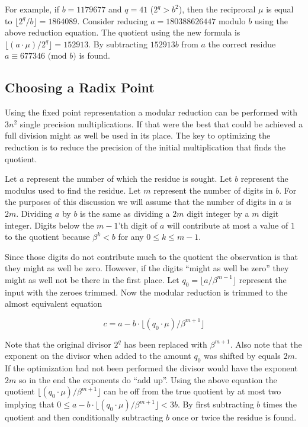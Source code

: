 \documentclass[b5paper]{book}
\begin{document}
For example, if $b = 1179677$ and $q = 41$ ($2^q > b^2$), then the reciprocal $\mu$ is equal to $\lfloor 2^q / b \rfloor = 1864089$.  Consider reducing
$a = 180388626447$ modulo $b$ using the above reduction equation.  The quotient using the new formula is $\lfloor (a \cdot \mu) / 2^q \rfloor = 152913$.
By subtracting $152913b$ from $a$ the correct residue $a \equiv 677346 \mbox{ (mod }b\mbox{)}$ is found.

\subsection{Choosing a Radix Point}
Using the fixed point representation a modular reduction can be performed with $3n^2$ single precision multiplications.  If that were the best
that could be achieved a full division might as well be used in its place.  The key to optimizing the reduction is to reduce the precision of
the initial multiplication that finds the quotient.  

Let $a$ represent the number of which the residue is sought.  Let $b$ represent the modulus used to find the residue.  Let $m$ represent
the number of digits in $b$.  For the purposes of this discussion we will assume that the number of digits in $a$ is $2m$.  Dividing $a$ by 
$b$ is the same as dividing a $2m$ digit integer by a $m$ digit integer.  Digits below the $m - 1$'th digit of $a$ will contribute at most a value
of $1$ to the quotient because $\beta^k < b$ for any $0 \le k \le m - 1$.  

Since those digits do not contribute much to the quotient the observation is that they might as well be zero.  However, if the digits 
``might as well be zero'' they might as well not be there in the first place.  Let $q_0 = \lfloor a/\beta^{m-1} \rfloor$ represent the input
with the zeroes trimmed.  Now the modular reduction is trimmed to the almost equivalent equation

\begin{equation}
c = a - b \cdot \lfloor (q_0 \cdot \mu) / \beta^{m+1} \rfloor
\end{equation}

Note that the original divisor $2^q$ has been replaced with $\beta^{m+1}$. Also note that the exponent on the divisor when added to the amount $q_0$
was shifted by equals $2m$.  If the optimization had not been performed the divisor would have the exponent $2m$ so in the end the exponents
do ``add up''. Using the above equation the quotient $\lfloor (q_0 \cdot \mu) / \beta^{m+1} \rfloor$ can be off from the true quotient by at most 
two implying that $0 \le a - b \cdot \lfloor (q_0 \cdot \mu) / \beta^{m+1} \rfloor < 3b$.  By first subtracting $b$ times the quotient and then 
conditionally subtracting $b$ once or twice the residue is found.
\end{document}

